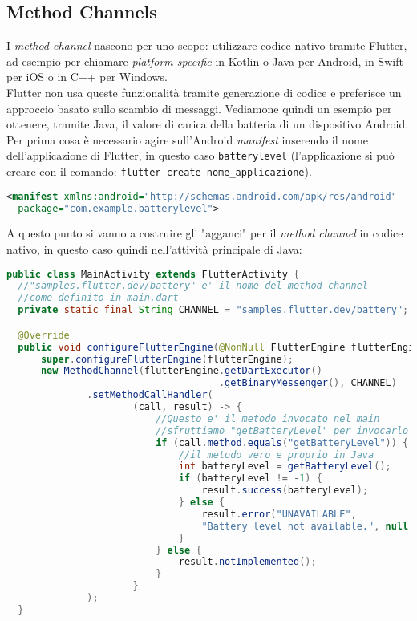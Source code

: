 \begin{appendices}
\section{Method Channels}
I \textit{method channel} nascono per uno scopo: utilizzare codice nativo tramite Flutter, ad esempio per chiamare \api{} \textit{platform-specific} in Kotlin o Java per Android, in Swift per iOS o in C++ per Windows.\\
Flutter non usa queste funzionalità tramite generazione di codice e preferisce un approccio basato sullo scambio di messaggi. Vediamone quindi un esempio per ottenere, tramite Java, il valore di carica della batteria di un dispositivo Android.\\
Per prima cosa è necessario agire sull'Android \textit{manifest} inserendo il nome dell'applicazione di Flutter, in questo caso \verb+batterylevel+ (l'applicazione si può creare con il comando: \verb+flutter create nome_applicazione+).

\begin{lstlisting}[language=XML, firstnumber=1,caption={Android \textit{manifest}}]
<manifest xmlns:android="http://schemas.android.com/apk/res/android"
  package="com.example.batterylevel">
\end{lstlisting}

A questo punto si vanno a costruire gli "agganci" per il \textit{method channel} in codice nativo, in questo caso quindi nell'attività principale di Java:

\begin{lstlisting}[language=Java, firstnumber=1,caption={Java \textit{main activity}}]
public class MainActivity extends FlutterActivity {
  //"samples.flutter.dev/battery" e' il nome del method channel
  //come definito in main.dart
  private static final String CHANNEL = "samples.flutter.dev/battery";

  @Override
  public void configureFlutterEngine(@NonNull FlutterEngine flutterEngine) {
      super.configureFlutterEngine(flutterEngine);
      new MethodChannel(flutterEngine.getDartExecutor()
                                     .getBinaryMessenger(), CHANNEL)
              .setMethodCallHandler(
                      (call, result) -> {
                          //Questo e' il metodo invocato nel main
                          //sfruttiamo "getBatteryLevel" per invocarlo
                          if (call.method.equals("getBatteryLevel")) {
                              //il metodo vero e proprio in Java
                              int batteryLevel = getBatteryLevel();
                              if (batteryLevel != -1) {
                                  result.success(batteryLevel);
                              } else {
                                  result.error("UNAVAILABLE", 
                                  "Battery level not available.", null);
                              }
                          } else {
                              result.notImplemented();
                          }
                      }
              );
  }


\end{lstlisting}
\end{appendices}
